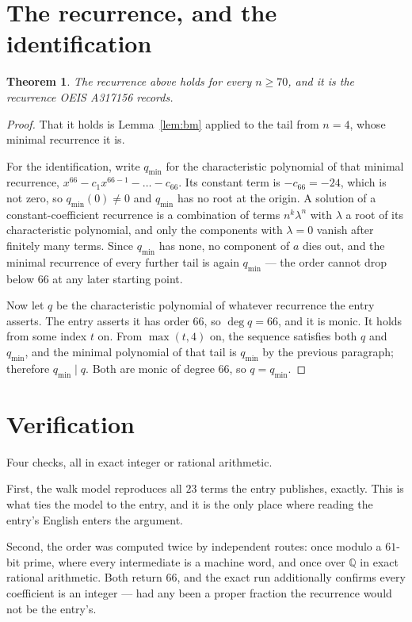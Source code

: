 \documentclass[11pt,a4paper]{article}
\theoremstyle{plain}
\newtheorem{theorem}{Theorem}
\theoremstyle{definition}
\begin{document}
\section{The recurrence, and the identification}

\begin{theorem}
The recurrence above holds for every $n\ge70$, and it is the recurrence OEIS A317156 records.
\end{theorem}

\begin{proof}
That it holds is Lemma~\ref{lem:bm} applied to the tail from $n=4$, whose minimal
recurrence it is.

For the identification, write $q_{\min}$ for the characteristic polynomial of that minimal
recurrence, $x^{66}-c_1x^{66-1}-\dots-c_{66}$. Its constant term is
$-c_{66}=-24$, which is not zero, so $q_{\min}(0)\neq0$ and $q_{\min}$ has no
root at the origin. A solution of a constant-coefficient recurrence is a combination of terms
$n^{k}\lambda^{n}$ with $\lambda$ a root of its characteristic polynomial, and only the
components with $\lambda=0$ vanish after finitely many terms. Since $q_{\min}$ has none, no
component of $a$ dies out, and the minimal recurrence of every further tail is again
$q_{\min}$ --- the order cannot drop below $66$ at any later starting point.

Now let $q$ be the characteristic polynomial of whatever recurrence the entry asserts. The
entry asserts it has order $66$, so $\deg q=66$, and it is monic. It holds from some
index $t$ on. From $\max(t,4)$ on, the sequence satisfies both $q$ and $q_{\min}$, and
the minimal polynomial of that tail is $q_{\min}$ by the previous paragraph; therefore
$q_{\min}\mid q$. Both are monic of degree $66$, so $q=q_{\min}$.
\end{proof}

\section{Verification}

Four checks, all in exact integer or rational arithmetic.

First, the walk model reproduces all $23$ terms the entry publishes, exactly. This is
what ties the model to the entry, and it is the only place where reading the entry's English
enters the argument.

Second, the order was computed twice by independent routes: once modulo a $61$-bit prime, where
every intermediate is a machine word, and once over $\mathbb{Q}$ in exact rational arithmetic.
Both return $66$, and the exact run additionally confirms every coefficient is an integer
--- had any been a proper fraction the recurrence would not be the entry's.
\end{document}
